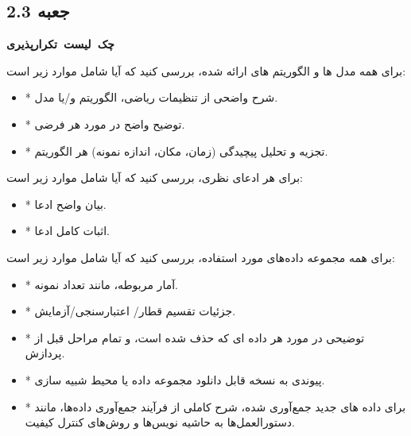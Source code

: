 \newpage

\begin{tcolorbox}[colback=gray!10,colframe=black,breakable]

    \section*{جعبه 2.3}
    \label{sec:جعبه 2.3}
    \begin{Large}
        \textbf{\mbox{چک لیست تکرارپذیری}}
    \end{Large}
    \newline
    برای همه مدل ها و الگوریتم های ارائه شده، بررسی کنید که آیا شامل موارد زیر است:

    \begin{itemize}[itemsep=0.2ex]
        \item * شرح واضحی از تنظیمات ریاضی، الگوریتم و/یا مدل.
        \item * توضیح واضح در مورد هر فرضی.
        \item * تجزیه و تحلیل پیچیدگی (زمان، مکان، اندازه نمونه) هر الگوریتم.
        \newline
    \end{itemize}

    برای هر ادعای نظری، بررسی کنید که آیا شامل موارد زیر است:
    \begin{itemize}[itemsep=0.2ex]
        \item * بیان واضح ادعا.
        \item * اثبات کامل ادعا.
        \newline
    \end{itemize}

    برای همه مجموعه داده‌های مورد استفاده، بررسی کنید که آیا شامل موارد زیر است:
    \begin{itemize}[itemsep=0.2ex]
        \item * آمار مربوطه، مانند تعداد نمونه.
        \item * جزئیات تقسیم قطار/ اعتبارسنجی/آزمایش.
        \item * توضیحی در مورد هر داده ای که حذف شده است، و تمام مراحل قبل از پردازش.
        \item * پیوندی به نسخه قابل دانلود مجموعه داده یا محیط شبیه سازی.
        \item * برای داده های جدید جمع‌آوری شده، شرح کاملی از فرآیند جمع‌آوری داده‌ها، مانند دستورالعمل‌ها به حاشیه نویس‌ها و روش‌های کنترل کیفیت.
        \newline
    \end{itemize}


\end{tcolorbox}
